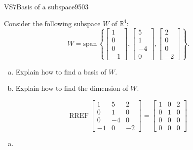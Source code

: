 \begin{exercise}{VS7}{Basis of a subspace}{9503} 
\begin{exerciseStatement} 

 Consider the following subspace \(W\) of \(\mathbb R^4\): \[W=\mathrm{span}\,\left\{ \left[\begin{array}{c}
1 \\
0 \\
0 \\
-1
\end{array}\right] , \left[\begin{array}{c}
5 \\
1 \\
-4 \\
0
\end{array}\right] , \left[\begin{array}{c}
2 \\
0 \\
0 \\
-2
\end{array}\right] \right\}.\] 

 

\begin{enumerate}[(a)]
\item 

Explain how to find a basis of \(W\).


\item 

Explain how to find the dimension of \(W\).


\end{enumerate}

     \end{exerciseStatement}
 \begin{exerciseAnswer} 

\[\mathrm{RREF}\,\left[\begin{array}{ccc}
1 & 5 & 2 \\
0 & 1 & 0 \\
0 & -4 & 0 \\
-1 & 0 & -2
\end{array}\right]=\left[\begin{array}{ccc}
1 & 0 & 2 \\
0 & 1 & 0 \\
0 & 0 & 0 \\
0 & 0 & 0
\end{array}\right]\]

 

\begin{enumerate}[(a)]
\item 


\end{enumerate}
\end{exerciseAnswer}
\end{exercise}
